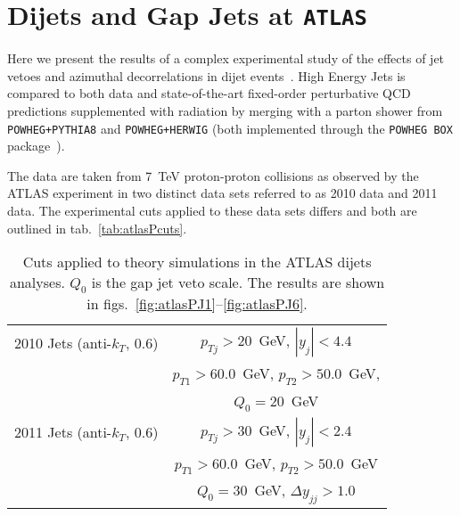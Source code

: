 
\chapter{Dijets and Gap Jets at \texttt{ATLAS}}
\label{chap:ATLAS}

	Here we present the results of a complex experimental study of the effects of jet vetoes and
	azimuthal decorrelations in dijet events~\cite{Aad:2014pua}.  High Energy Jets is compared
	to both data and state-of-the-art fixed-order perturbative QCD predictions supplemented with
	radiation by merging with a parton shower from \texttt{POWHEG+PYTHIA8} and \texttt{POWHEG+HERWIG}
	(both implemented through the \texttt{POWHEG BOX} package~\cite{1126-6708-2004-11-040}).

	The data are taken from 7~TeV proton-proton collisions as observed by the ATLAS
	experiment in two distinct data sets referred to as 2010 data and 2011 data.  The
	experimental cuts applied to these data sets differs and both are outlined in tab.~\eqref{tab:atlasPcuts}.

	\begin{table}[bth]
	  \centering
	  \begin{tabular}{|l|c|}
	    \hline
	    2010 Jets (anti-$k_T$, 0.6) & $p_{Tj}>20$~GeV, \; $|y_j|<4.4$ \\
	    & $p_{T1}> 60.0$~GeV, \; $p_{T2}> 50.0$~GeV, \; \\
	    & $Q_0=20$~GeV \\
	    \hline
	    2011 Jets (anti-$k_T$, 0.6) & $p_{Tj}>30$~GeV, \; $|y_j|<2.4$ \\
	    & $p_{T1}> 60.0$~GeV, \; $p_{T2}> 50.0$~GeV \\
	    & \; $Q_0=30$~GeV, \; $\Delta y_{jj}>1.0$\\
	\hline
	  \end{tabular}
	  \caption{Cuts applied to theory simulations in the ATLAS dijets analyses.
	  $Q_0$ is the gap jet veto scale. The results are shown in
	  figs.~\eqref{fig:atlasPJ1}--\eqref{fig:atlasPJ6}.}
	  \label{tab:atlasPcuts}
	\end{table}

